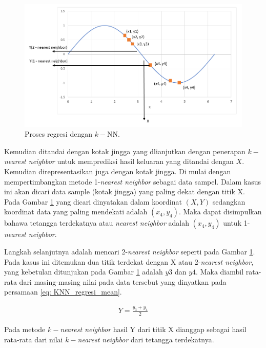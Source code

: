 \begin{subs}
\begin{enumerate}[label=\textbf{\alph*).}]
		\begin{figure} [!h] \centering
			\includegraphics[scale=0.6]{img/k-nn_sinosoid.png}
			\caption{Proses regresi dengan $k-$NN.}
			\label{fig:k-nn_sinosoid}
		\end{figure}
		
		Kemudian ditandai dengan kotak jingga yang dlianjutkan dengan penerapan $k-$\textit{nearest neighbor} untuk memprediksi hasil keluaran yang ditandai dengan $X$. Kemudian direpresentasikan juga dengan kotak jingga. Di mulai dengan mempertimbangkan metode 1-\textit{nearest neighbor} sebagai data sampel. Dalam kasus ini akan dicari data sample (kotak jingga) yang paling dekat dengan titik X. Pada Gambar \ref{fig:k-nn_sinosoid} yang dicari dinyatakan dalam koordinat $(X, Y)$ sedangkan koordinat data yang paling mendekati adalah $(x_{4}, y_{4})$. Maka dapat disimpulkan bahawa tetangga terdekatnya atau \textit{nearest neighbor} adalah $(x_{4}, y_{4})$ untuk 1-\textit{nearest neighbor}.
		\vspace{1ex}
		
		Langkah selanjutnya adalah mencari 2-\textit{nearest neighbor} seperti pada Gambar \ref{fig:k-nn_sinosoid}. Pada kasus ini ditemukan dua titik terdekat dengan X atau 2-\textit{nearest neighbor}, yang kebetulan ditunjukan pada Gambar \ref{fig:k-nn_sinosoid} adalah $y3$ dan $y4$. Maka diambil rata-rata dari masing-masing nilai pada data tersebut yang dinyatkan pada persamaan \ref{eq: KNN_regresi_mean}.
		
		\begin{equation}\label{eq: KNN_regresi_mean}
		\begin{split}
		Y = \frac{y_{3} + y_{4}}{2}
		\end{split}
		\end{equation}
		
		Pada metode $k-$\textit{nearest neighbor} hasil Y dari titik X dianggap sebagai hasil rata-rata dari nilai $k-$\textit{nearest neighbor} dari tetangga terdekatnya.
		\vspace{1ex}
		

\end{enumerate}
\end{subs}
